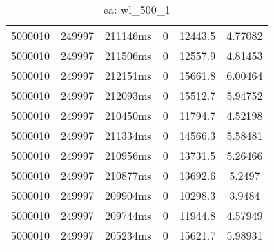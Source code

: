 \documentclass[./main.tex]{subfiles}
\begin{document}
\begin{table}
\begin{tabular}{ c | c | c | c | c | c }
        \hline
        5000010 & 249997 & 211146ms & 0 & 12443.5 & 4.77082 \\
        5000010 & 249997 & 211506ms & 0 & 12557.9 & 4.81453 \\
        5000010 & 249997 & 212151ms & 0 & 15661.8 & 6.00464 \\
        5000010 & 249997 & 212093ms & 0 & 15512.7 & 5.94752 \\
        5000010 & 249997 & 210450ms & 0 & 11794.7 & 4.52198 \\
        5000010 & 249997 & 211334ms & 0 & 14566.3 & 5.58481 \\
        5000010 & 249997 & 210956ms & 0 & 13731.5 & 5.26466 \\
        \rowcolor{lightgray} 5000010 & 249997 & 210877ms & 0 & 13692.6 & 5.2497 \\
        5000010 & 249997 & 209904ms & 0 & 10298.3 & 3.9484 \\
        5000010 & 249997 & 209744ms & 0 & 11944.8 & 4.57949 \\
        5000010 & 249997 & 205234ms & 0 & 15621.7 & 5.98931 \\
    \end{tabular}
    \caption{ea: wl\_500\_1}
\end{table}
\end{document}
